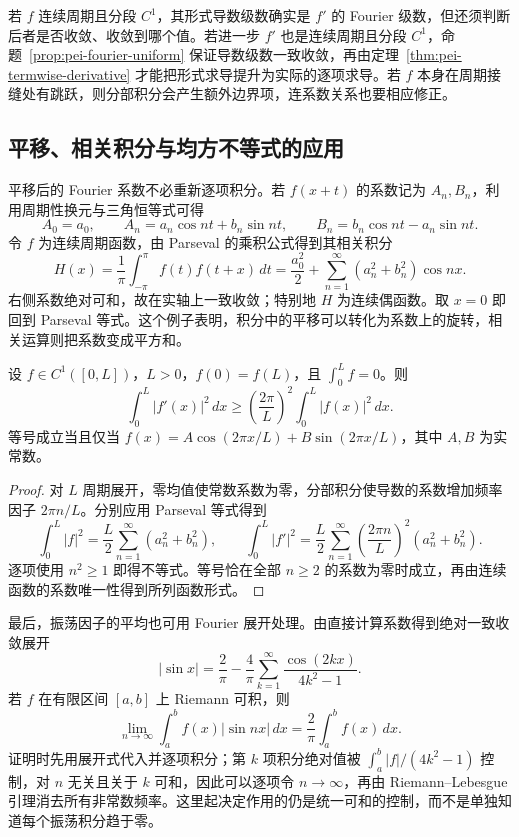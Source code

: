 若 $f$ 连续周期且分段 $C^1$，其形式导数级数确实是 $f'$ 的 Fourier 级数，但还须判断后者是否收敛、收敛到哪个值。若进一步 $f'$ 也是连续周期且分段 $C^1$，命题~\ref{prop:pei-fourier-uniform} 保证导数级数一致收敛，再由定理~\ref{thm:pei-termwise-derivative} 才能把形式求导提升为实际的逐项求导。若 $f$ 本身在周期接缝处有跳跃，则分部积分会产生额外边界项，连系数关系也要相应修正。

\subsection{平移、相关积分与均方不等式的应用}

平移后的 Fourier 系数不必重新逐项积分。若 $f(x+t)$ 的系数记为 $A_n,B_n$，利用周期性换元与三角恒等式可得
\[
 A_0=a_0,\qquad
 A_n=a_n\cos nt+b_n\sin nt,\qquad
 B_n=b_n\cos nt-a_n\sin nt.
\]
令 $f$ 为连续周期函数，由 Parseval 的乘积公式得到其相关积分
\begin{equation}
 H(x)=\frac1\pi\int_{-\pi}^{\pi}f(t)f(t+x)\,dt
 =\frac{a_0^2}{2}+\sum_{n=1}^{\infty}(a_n^2+b_n^2)\cos nx.
 \label{eq:pei-fourier-correlation}
\end{equation}
右侧系数绝对可和，故在实轴上一致收敛；特别地 $H$ 为连续偶函数。取 $x=0$ 即回到 Parseval 等式。这个例子表明，积分中的平移可以转化为系数上的旋转，相关运算则把系数变成平方和。

\begin{proposition}
设 $f\in C^1([0,L])$，$L>0$，$f(0)=f(L)$，且 $\int_0^Lf=0$。则
\[
 \int_0^L|f'(x)|^2\,dx
 \geq\left(\frac{2\pi}{L}\right)^2\int_0^L|f(x)|^2\,dx.
\]
等号成立当且仅当 $f(x)=A\cos(2\pi x/L)+B\sin(2\pi x/L)$，其中 $A,B$ 为实常数。
\end{proposition}
\begin{proof}
对 $L$ 周期展开，零均值使常数系数为零，分部积分使导数的系数增加频率因子 $2\pi n/L$。分别应用 Parseval 等式得到
\[
 \int_0^L|f|^2=\frac L2\sum_{n=1}^{\infty}(a_n^2+b_n^2),\qquad
 \int_0^L|f'|^2=\frac L2\sum_{n=1}^{\infty}
 \left(\frac{2\pi n}{L}\right)^2(a_n^2+b_n^2).
\]
逐项使用 $n^2\geq1$ 即得不等式。等号恰在全部 $n\geq2$ 的系数为零时成立，再由连续函数的系数唯一性得到所列函数形式。
\end{proof}

最后，振荡因子的平均也可用 Fourier 展开处理。由直接计算系数得到绝对一致收敛展开
\[
 |\sin x|=\frac2\pi-\frac4\pi\sum_{k=1}^{\infty}\frac{\cos(2kx)}{4k^2-1}.
\]
若 $f$ 在有限区间 $[a,b]$ 上 Riemann 可积，则
\[
 \lim_{n\to\infty}\int_a^bf(x)|\sin nx|\,dx
 =\frac2\pi\int_a^bf(x)\,dx.
\]
证明时先用展开式代入并逐项积分；第 $k$ 项积分绝对值被 $\int_a^b|f|/(4k^2-1)$ 控制，对 $n$ 无关且关于 $k$ 可和，因此可以逐项令 $n\to\infty$，再由 Riemann--Lebesgue 引理消去所有非常数频率。这里起决定作用的仍是统一可和的控制，而不是单独知道每个振荡积分趋于零。






